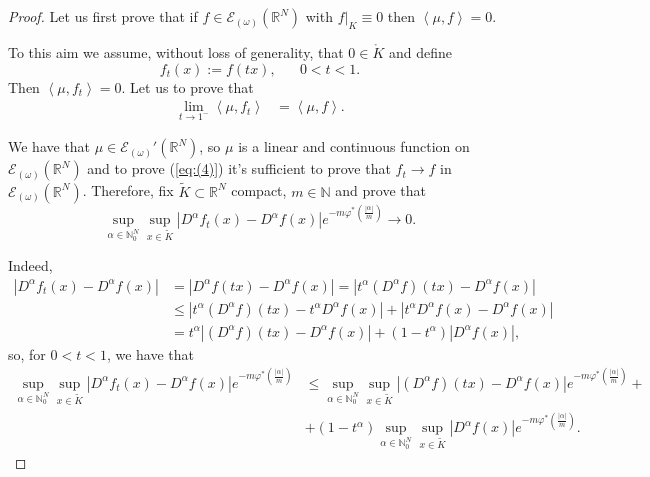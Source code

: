 \documentclass[twoside]{amsart}
\begin{document}
\begin{proof}
Let us first prove that if $f\in{\mathcal{E}}_{(\omega)}({\mathbb R}^N)$ with 
$\left.f\right|_{K}\equiv0$
then $\left\langle \mu,f\right\rangle =0$.

To this aim we assume, without loss of generality, that $0\in\mathring{K}$
and define
\[
f_{t}(x):=f(tx),\,\,\,\,\,\,\,\,\,\,0<t<1.
\]
Then $\left\langle \mu,f_{t}\right\rangle =0$. Let us to prove that
\begin{align}
  {\displaystyle \underset{t\rightarrow1^{-}}{\lim}}\left\langle
  \mu,f_{t}\right\rangle  & =\left\langle \mu,f\right\rangle .
  \label{eq:(4)}
\end{align}

We have that $\mu\in{\mathcal{E}}_{(\omega)}'({\mathbb R}^N)$, so $\mu$ is a linear and continuous
function on ${\mathcal{E}}_{(\omega)}({\mathbb R}^N)$ and to prove (\ref{eq:(4)}) it's sufficient
to prove that $f_{t}\rightarrow f$ in ${\mathcal{E}}_{(\omega)}({\mathbb R}^N)$. Therefore, fix
$\tilde{K}\subset{\mathbb R}^N$ compact, $m\in{\mathbb N}$ and prove that 
\begin{equation}
  \sup_{\alpha\in{\mathbb N}_0^N}\sup_{x\in\tilde K}
  |D^{\alpha}f_{t}(x)-D^{\alpha}f(x)|e^{-m\varphi^{*}\left(\frac{|\alpha|}{m}\right)}
  \rightarrow0.
  \label{eq:(5)}
\end{equation}

Indeed,
\begin{align*}
|D^{\alpha}f_{t}(x)-D^{\alpha}f(x)| & =|D^{\alpha}f(tx)-D^{\alpha}f(x)|
  =\left|t^{\alpha}(D^{\alpha}f)(tx)-D^{\alpha}f(x)\right|\\
& \leq\left|t^{\alpha}(D^{\alpha}f)(tx)-t^{\alpha}D^{\alpha}f(x)\right|
+\left|t^{\alpha}D^{\alpha}f(x)-D^{\alpha}f(x)\right|\\
& =t^{\alpha}\left|(D^{\alpha}f)(tx)-D^{\alpha}f(x)\right|+
(1-t^{\alpha})\left|D^{\alpha}f(x)\right|,
\end{align*}
so, for $0<t<1$, we have that 
\begin{align}
  \sup_{\alpha\in{\mathbb N}_0^N}\sup_{x\in\tilde K}
    |D^{\alpha}f_{t}(x)-D^{\alpha}f(x)|e^{-m\varphi^{*}\left(\frac{|\alpha|}{m}\right)} &
  \leq\sup_{\alpha\in{\mathbb N}_0^N}\sup_{x\in\tilde K}
  |(D^{\alpha}f)(tx)-D^{\alpha}f(x)|e^{-m\varphi^{*}\left(\frac{|\alpha|}{m}\right)}+
  \label{eq:(8)}\\
  & +(1-t^{\alpha})\sup_{\alpha\in{\mathbb N}_0^N}\sup_{x\in\tilde K}
  |D^{\alpha}f(x)|e^{-m\varphi^{*}\left(\frac{|\alpha|}{m}\right)}.
  \nonumber 
\end{align}


\end{proof}
\end{document}
